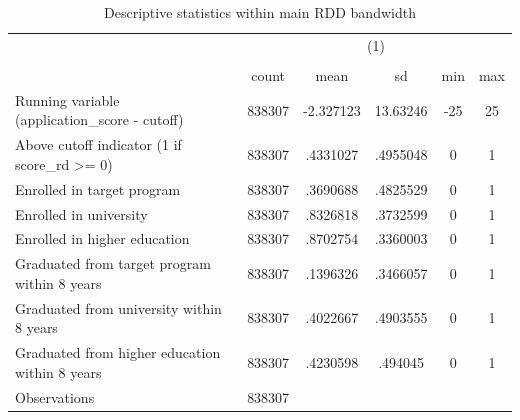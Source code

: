 \begin{table}[htbp]\centering
\def\sym#1{\ifmmode^{#1}\else\(^{#1}\)\fi}
\caption{Descriptive statistics within main RDD bandwidth}
\begin{tabular}{l*{1}{ccccc}}
\toprule
                    &\multicolumn{5}{c}{(1)}                                         \\
                    &\multicolumn{5}{c}{}                                            \\
                    &       count&        mean&          sd&         min&         max\\
\midrule
Running variable (application\_score - cutoff)&      838307&   -2.327123&    13.63246&         -25&          25\\
Above cutoff indicator (1 if score\_rd >= 0)&      838307&    .4331027&    .4955048&           0&           1\\
Enrolled in target program&      838307&    .3690688&    .4825529&           0&           1\\
Enrolled in university&      838307&    .8326818&    .3732599&           0&           1\\
Enrolled in higher education&      838307&    .8702754&    .3360003&           0&           1\\
Graduated from target program within 8 years&      838307&    .1396326&    .3466057&           0&           1\\
Graduated from university within 8 years&      838307&    .4022667&    .4903555&           0&           1\\
Graduated from higher education within 8 years&      838307&    .4230598&     .494045&           0&           1\\
\midrule
Observations        &      838307&            &            &            &            \\
\bottomrule
\end{tabular}
\end{table}
